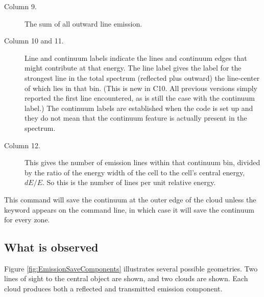 \begin{description}
\item[Column 9.] The sum of all outward line emission.

\item[Column 10 and 11.]  Line and continuum labels indicate the lines and
continuum edges that might contribute at that energy.  The line label gives the
label for the strongest line in the total spectrum (reflected plus outward) 
the line-center of which lies in that bin. 
(This is new in C10.  All previous versions simply reported the first line 
encountered, as is still the case with the continuum label.)   
The continuum labels are established when the code
is set up and they do not mean that the continuum feature is actually
present in the spectrum.  

\item[Column 12.]  This gives the number of emission lines within that continuum
bin, divided by the ratio of the energy width of the cell to the cell's
central energy, $dE/E$.  So this is the number of lines per unit relative
energy.
\end{description}

\noindent
This command will save the continuum at the outer edge of the cloud unless the
keyword  appears on the command line, in which case it will
save the continuum for every zone.

\subsection{What is observed}

Figure \ref{fig:EmissionSaveComponents} illustrates several
possible geometries.
Two lines of sight to the central object are shown,
and two clouds are shown.
Each cloud produces both a reflected and transmitted emission component.

